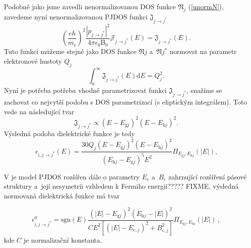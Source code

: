 Podobně jako jsme zavedli nenormalizovanou DOS funkce $\mathfrak{N}_j$ (\ref{unormN}), zavedeme nyní nenormalizovanou PJDOS funkci $\mathfrak{J}_{j \rightarrow j^*}$
\begin{equation}
\left(\frac{eh}{m_\mathrm{e}} \right)^2 \frac{| p_{j \rightarrow j^*} |^2}{4 \pi \epsilon_0 \mathrm{B}_0} \mathcal{J}_{j \rightarrow j^*}(E)
= \mathfrak{J}_{j \rightarrow j^*}(E) \text{.}
\end{equation}
Tuto funkci můžeme stejně jako DOS funkce $\mathfrak{N}{j}$ a~$\mathfrak{N}{j}^*$ normovat na parametr elektronové hustoty $Q_j$
\begin{equation}
\int_0^\infty \mathfrak{J}_{j \rightarrow j^*}(E)\mathrm{d}E = Q_j^2 \text{.}
\end{equation}
Nyní je potřeba potřeba vhodně parametrizovat funkci $\mathfrak{J}_{j \rightarrow j^*}$, snažíme se zachovat co nejvytší podobu s DOS parametrizací (s eliptickým integrálem). Toto vede na následující tvar
\begin{equation}
\mathfrak{J}_{j \rightarrow j^*} \propto (E - E_{\mathrm{g}j})^2 (E - E_{\mathrm{h}j})^2 \text{.}
\end{equation} 
Výsledná podoba dielektrické funkce je tedy
\begin{equation}
\label{PJDOS1}
\epsilon_{\mathrm{i},j \rightarrow j^*}(E) = 
\frac{30Q_j (E - E_{\mathrm{g}j})^2 (E - E_{\mathrm{h}j})^2 }{(E_{\mathrm{h}j} - E_{\mathrm{g}j})^5 E^2 } 
\Pi_{E_{\mathrm{g}j},E_{\mathrm{h}j}}(|E|)
\text{,}
\end{equation}

V \cite{sumrule2} je model PJDOS rozšířen dále o parametry $E_\mathrm{c}$ a~$B_\mathrm{c}$ zahrnující rozšíření pásové struktury a~její nesymetrii vzhledem k Fermiho energii????? FIXME, výsledná normovaná dielektrická funkce má tvar

\begin{equation}
\label{valencvod}
\epsilon_{\mathrm{i},j \rightarrow j^*}^0 = 
\mathrm{sgn}(E) 
\frac	{(|E|- E_{\mathrm{g}j})^2(E_{\mathrm{h}j} - |E|)^2}
	{ C E^2 [(|E| - E_{\mathrm{c},j})^2 + B_{\mathrm{c},j}^2]} 
\Pi_{E_{\mathrm{g}j},E_{\mathrm{h}j}}(|E|) \, \mathrm{,}
\end{equation}
kde $C$ je normalizační konstanta.

